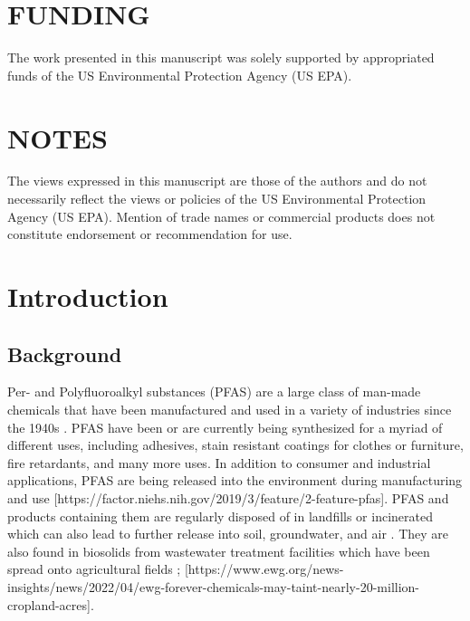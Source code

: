 \documentclass[
  super,
  preprint,
  3p]{elsarticle}
\begin{document}
\hypertarget{funding}{%
\section*{FUNDING}\label{funding}}

The work presented in this manuscript was solely supported by
appropriated funds of the US Environmental Protection Agency (US EPA).

\hypertarget{notes}{%
\section*{NOTES}\label{notes}}

The views expressed in this manuscript are those of the authors and do
not necessarily reflect the views or policies of the US Environmental
Protection Agency (US EPA). Mention of trade names or commercial
products does not constitute endorsement or recommendation for use.

\hypertarget{introduction}{%
\section{Introduction}\label{introduction}}

\hypertarget{background}{%
\subsection{Background}\label{background}}

Per- and Polyfluoroalkyl substances (PFAS) are a large class of man-made
chemicals that have been manufactured and used in a variety of
industries since the 1940s
\citep{wang_never-ending_2017, gluge_overview_2020, gaines_historical_2023}.
PFAS have been or are currently being synthesized for a myriad of
different uses, including adhesives, stain resistant coatings for
clothes or furniture, fire retardants, and many more uses. In addition
to consumer and industrial applications, PFAS are being released into
the environment during manufacturing and use
{[}https://factor.niehs.nih.gov/2019/3/feature/2-feature-pfas{]}. PFAS
and products containing them are regularly disposed of in landfills or
incinerated which can also lead to further release into soil,
groundwater, and air \citep{chen_evaluation_2023, li_critical_2023}.
They are also found in biosolids from wastewater treatment facilities
which have been spread onto agricultural fields
\citep{bolan_distribution_2021};
{[}https://www.ewg.org/news-insights/news/2022/04/ewg-forever-chemicals-may-taint-nearly-20-million-cropland-acres{]}.
\end{document}
